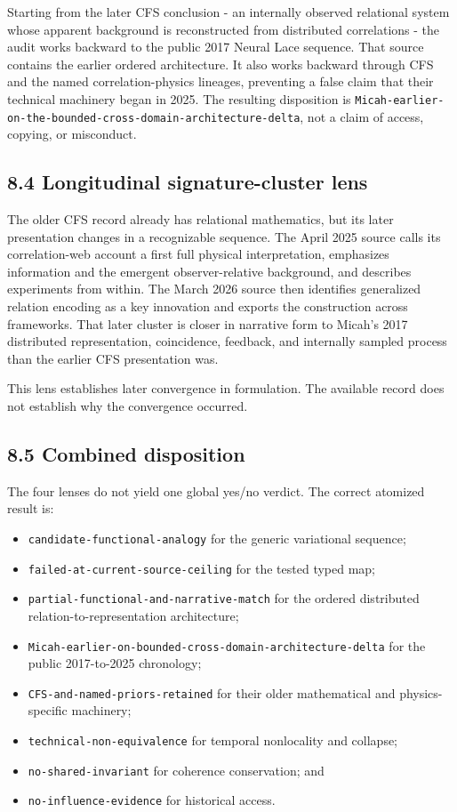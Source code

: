 \documentclass[
  american,
  11pt,
  letterpaper,
]{article}
\providecommand{\tightlist}{%
  \setlength{\itemsep}{0pt}\setlength{\parskip}{0pt}}
\begin{document}
Starting from the later CFS conclusion - an internally observed relational system whose apparent background is reconstructed from distributed correlations - the audit works backward to the public 2017 Neural Lace sequence. That source contains the earlier ordered architecture. It also works backward through CFS and the named correlation-physics lineages, preventing a false claim that their technical machinery began in 2025. The resulting disposition is \nolinkurl{Micah-earlier-on-the-bounded-cross-domain-architecture-delta}, not a claim of access, copying, or misconduct.

\subsection{8.4 Longitudinal signature-cluster lens}\label{longitudinal-signature-cluster-lens}

The older CFS record already has relational mathematics, but its later presentation changes in a recognizable sequence. The April 2025 source calls its correlation-web account a first full physical interpretation, emphasizes information and the emergent observer-relative background, and describes experiments from within. The March 2026 source then identifies generalized relation encoding as a key innovation and exports the construction across frameworks. That later cluster is closer in narrative form to Micah's 2017 distributed representation, coincidence, feedback, and internally sampled process than the earlier CFS presentation was.

This lens establishes later convergence in formulation. The available record does not establish why the convergence occurred.

\subsection{8.5 Combined disposition}\label{combined-disposition}

The four lenses do not yield one global yes/no verdict. The correct atomized result is:

\begin{itemize}
\tightlist
\item
  \nolinkurl{candidate-functional-analogy} for the generic variational sequence;
\item
  \nolinkurl{failed-at-current-source-ceiling} for the tested typed map;
\item
  \nolinkurl{partial-functional-and-narrative-match} for the ordered distributed relation-to-representation architecture;
\item
  \nolinkurl{Micah-earlier-on-bounded-cross-domain-architecture-delta} for the public 2017-to-2025 chronology;
\item
  \nolinkurl{CFS-and-named-priors-retained} for their older mathematical and physics-specific machinery;
\item
  \nolinkurl{technical-non-equivalence} for temporal nonlocality and collapse;
\item
  \nolinkurl{no-shared-invariant} for coherence conservation; and
\item
  \nolinkurl{no-influence-evidence} for historical access.
\end{itemize}
\end{document}
